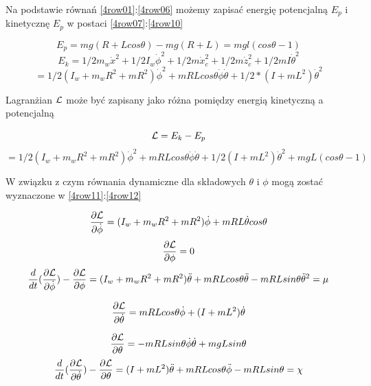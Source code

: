 Na podstawie równań \ref{4row01}:\ref{4row06} możemy zapisać energię potencjalną $E_p$ i kinetycznę $E_p$ w postaci \ref{4row07}:\ref{4row10}

\begin{equation}    
\label{4row07}     
E_p=mg(R+Lcos\theta)-mg(R+L)=mgl(cos\theta-1)
 \end{equation}
 \begin{equation}  E_k=1/2 m_w\dot{x}^2+1/2 I_w \dot{\phi}^2+1/2m\dot{x}_c^2+1/2m\dot{z}_c^2 +1/2mI\dot{\theta}^2   
  \end{equation}
\begin{equation} 
\label{4row10}    
 =1/2(I_w+m_wR^2+mR^2)\dot{\phi}^2 +mRLcos\theta \dot{\phi}\dot{\theta}+1/2*(I+mL^2)\dot{\theta}^2
\end{equation}

Lagranżian  $\mathcal{L}$ może być zapisany jako różna pomiędzy energią kinetyczną a potencjalną

\begin{equation} 
\mathcal{L}=E_k-E_p
\end{equation}
\begin{equation} 
=1/2(I_w+m_wR^2 +mR^2)\dot{\phi}^2 +mRLcos\theta\dot{\phi}\dot{\theta}+
1/2(I+mL^2)\dot{\theta}^2 +mgL(cos\theta-1)
\end{equation}

W związku z czym równania dynamiczne dla składowych $\theta$ i $\phi$ mogą zostać wyznaczone w \ref{4row11}:\ref{4row12}

\begin{equation} 
\label{4row11}    
\dfrac{\partial \mathcal{L}}{\partial \dot{\phi}}=(I_w+m_wR^2+mR^2)\dot{\phi}+mRL\dot{\theta}cos\theta
\end{equation}
\begin{equation} 
\dfrac{\partial \mathcal{L}}{\partial \phi}=0
\end{equation}
\begin{equation} 
\dfrac{d}{dt}(\dfrac{\partial \mathcal{L}}{\partial \dot{\phi}})-\dfrac{\partial \mathcal{L}}{\partial \phi}=
(I_w +m_w R^2 +mR^2)\ddot{\theta}+mRLcos\theta\ddot{\theta}-mRLsin\theta\ddot{\theta}^2=\mu
\end{equation}




\begin{equation} 
\dfrac{\partial \mathcal{L}}{\partial \dot{\theta}}=mRLcos\theta\dot{\phi}+(I+mL^2)\dot{\theta}
\end{equation}

\begin{equation} 
\dfrac{\partial \mathcal{L}}{\partial \theta}=-mRLsin\theta\dot{\phi}\dot{\theta}+mgLsin\theta
\end{equation}
\begin{equation} 
\label{4row12}  
\dfrac{d}{dt}(\dfrac{\partial \mathcal{L}}{\partial \dot{\theta}})-\dfrac{\partial \mathcal{L}}{\partial \theta}=
(I+mL^2)\ddot{\theta}+mRLcos\theta\ddot{\phi}-mRLsin\theta=\chi
\end{equation}

